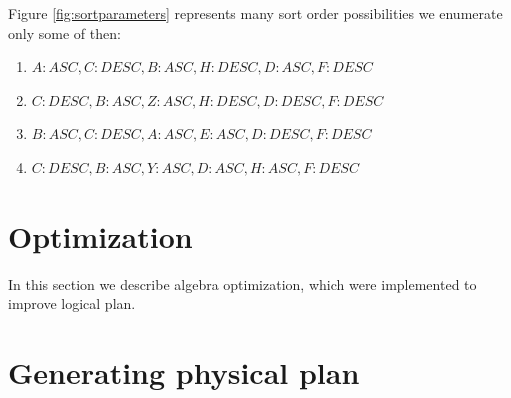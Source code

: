 Figure \ref{fig:sortparameters} represents many sort order possibilities we enumerate only some of then:
\begin{enumerate}
\item $A:ASC,C:DESC,B:ASC,H:DESC,D:ASC,F:DESC$
\item $C:DESC,B:ASC,Z:ASC,H:DESC,D:DESC,F:DESC$
\item $B:ASC,C:DESC,A:ASC,E:ASC,D:DESC,F:DESC$
\item $C:DESC,B:ASC,Y:ASC,D:ASC,H:ASC,F:DESC$
\end{enumerate}



\section{Optimization}

In this section we describe algebra optimization, which were implemented to improve logical plan.


\section{Generating physical plan}




